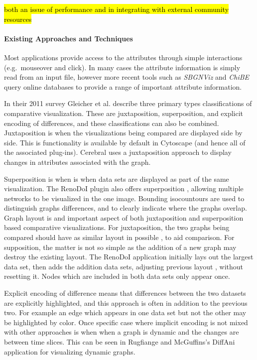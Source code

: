 \hl{both an issue of performance and in integrating with external community resources}

\paragraph*{Existing Approaches and Techniques}

Most applications provide access to the attributes through simple interactions (e.g.~mouseover and click).
In many cases the attribute information is simply read from an input file, however more recent tools such as \textit{SBGNViz} \cite{SBGNViz2015} and \textit{ChiBE}\cite{Babur2010chibe} query online databases to provide a range of important attribute information.

In their 2011 survey Gleicher et al. \cite{Gleicher2011} describe three primary types classifications of comparative visualization.
These are juxtaposition, superposition, and explicit encoding of differences, and these classifications can also be combined.
Juxtaposition is when the visualizations being compared are displayed side by side.
This is functionality is available by default in Cytoscape (and hence all of the associated plug-ins).
Cerebral uses a juxtaposition approach to display changes in attributes associated with the graph.

Superposition is when is when data sets are displayed as part of the same visualization.
The RenoDoI plugin also offers superposition , allowing multiple networks to be visualized in the one image. Bounding isocountours are used to distinguish graphs differences, and to clearly indicate where the graphs overlap.
Graph layout is and important aspect of both juxtaposition and superposition based comparative visualizations.
For juxtaposition, the two graphs being compared should have as similar layout in possible , to aid comparison.
For supposition, the matter is not so simple as the addition of a new graph may destroy the existing layout.
The RenoDoI application\cite{Vehlow2015} initially lays out the largest data set, then adds the addition data sets, adjusting previous layout , without resetting it.
Nodes which are included in both data sets only appear once.

Explicit encoding of difference means that differences between the two datasets are explicitly highlighted, and this approach is often in addition to the previous two. For example an edge which appears in one data set but not the other may be highlighted by color.
Once specific case where implicit encoding is not mixed with other approaches is when when a graph is dynamic and the changes are between time slices.
This can be seen in Rugfiange and McGuffins's DiffAni application \cite{Rufiange2013} for visualizing dynamic graphs.

